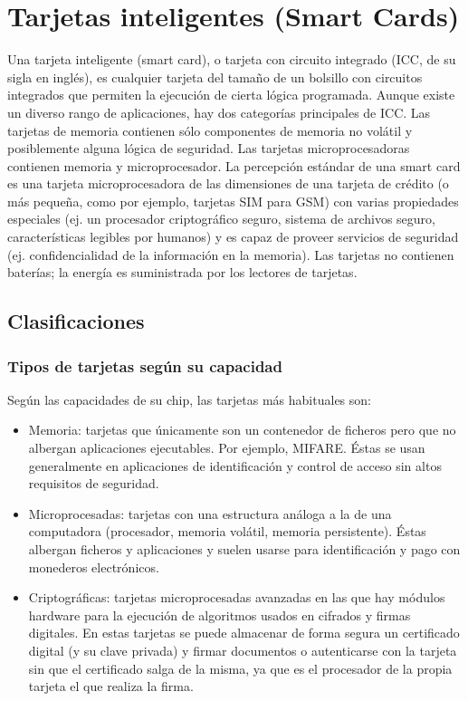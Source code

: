 \chapter{Tarjetas inteligentes (Smart Cards)}\label{anx_sc}

Una tarjeta inteligente (smart card), o tarjeta con circuito integrado (ICC, de su sigla en inglés), es cualquier tarjeta del tamaño de un bolsillo con circuitos integrados que permiten la ejecución de cierta lógica programada. 
Aunque existe un diverso rango de aplicaciones, hay dos categorías principales de ICC. Las tarjetas de memoria contienen sólo componentes de memoria no volátil y posiblemente alguna lógica de seguridad. Las tarjetas microprocesadoras contienen memoria y microprocesador.
La percepción estándar de una smart card es una tarjeta microprocesadora de las dimensiones de una tarjeta de crédito (o más pequeña, como por ejemplo, tarjetas SIM para GSM) con varias propiedades especiales (ej. un procesador criptográfico seguro, sistema de archivos seguro, características legibles por humanos) y es capaz de proveer servicios de seguridad (ej.     confidencialidad de la información en la memoria).
Las tarjetas no contienen baterías; la energía es suministrada por los lectores de tarjetas.

\section{Clasificaciones}

\subsection{Tipos de tarjetas según su capacidad}

\bigskip
Según las capacidades de su chip, las tarjetas más habituales son:

\begin{itemize}
\item Memoria: tarjetas que únicamente son un contenedor de ficheros pero que no albergan aplicaciones ejecutables. Por ejemplo, MIFARE. Éstas se usan generalmente en aplicaciones de identificación y control de acceso sin altos requisitos de seguridad. 
\item Microprocesadas: tarjetas con una estructura análoga a la de una computadora (procesador, memoria volátil, memoria persistente). Éstas albergan ficheros y aplicaciones y suelen usarse para identificación y pago con monederos electrónicos. 
\item Criptográficas: tarjetas microprocesadas avanzadas en las que hay módulos hardware para la ejecución de algoritmos usados en cifrados y firmas digitales. En estas tarjetas se puede almacenar de forma segura un certificado digital (y su clave privada) y firmar documentos o autenticarse con la tarjeta sin que el certificado salga de la misma, ya que es el procesador de la propia tarjeta el que realiza la firma.
\end{itemize}




